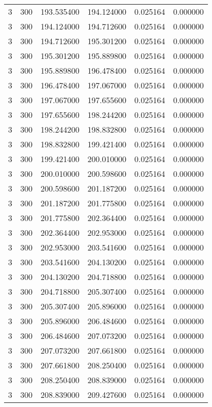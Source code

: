 \begin{longtable}{rrrrrr}
3 & 300 & 193.535400 & 194.124000 & 0.025164 & 0.000000 \\
3 & 300 & 194.124000 & 194.712600 & 0.025164 & 0.000000 \\
3 & 300 & 194.712600 & 195.301200 & 0.025164 & 0.000000 \\
3 & 300 & 195.301200 & 195.889800 & 0.025164 & 0.000000 \\
3 & 300 & 195.889800 & 196.478400 & 0.025164 & 0.000000 \\
3 & 300 & 196.478400 & 197.067000 & 0.025164 & 0.000000 \\
3 & 300 & 197.067000 & 197.655600 & 0.025164 & 0.000000 \\
3 & 300 & 197.655600 & 198.244200 & 0.025164 & 0.000000 \\
3 & 300 & 198.244200 & 198.832800 & 0.025164 & 0.000000 \\
3 & 300 & 198.832800 & 199.421400 & 0.025164 & 0.000000 \\
3 & 300 & 199.421400 & 200.010000 & 0.025164 & 0.000000 \\
3 & 300 & 200.010000 & 200.598600 & 0.025164 & 0.000000 \\
3 & 300 & 200.598600 & 201.187200 & 0.025164 & 0.000000 \\
3 & 300 & 201.187200 & 201.775800 & 0.025164 & 0.000000 \\
3 & 300 & 201.775800 & 202.364400 & 0.025164 & 0.000000 \\
3 & 300 & 202.364400 & 202.953000 & 0.025164 & 0.000000 \\
3 & 300 & 202.953000 & 203.541600 & 0.025164 & 0.000000 \\
3 & 300 & 203.541600 & 204.130200 & 0.025164 & 0.000000 \\
3 & 300 & 204.130200 & 204.718800 & 0.025164 & 0.000000 \\
3 & 300 & 204.718800 & 205.307400 & 0.025164 & 0.000000 \\
3 & 300 & 205.307400 & 205.896000 & 0.025164 & 0.000000 \\
3 & 300 & 205.896000 & 206.484600 & 0.025164 & 0.000000 \\
3 & 300 & 206.484600 & 207.073200 & 0.025164 & 0.000000 \\
3 & 300 & 207.073200 & 207.661800 & 0.025164 & 0.000000 \\
3 & 300 & 207.661800 & 208.250400 & 0.025164 & 0.000000 \\
3 & 300 & 208.250400 & 208.839000 & 0.025164 & 0.000000 \\
3 & 300 & 208.839000 & 209.427600 & 0.025164 & 0.000000 \\

\end{longtable}

